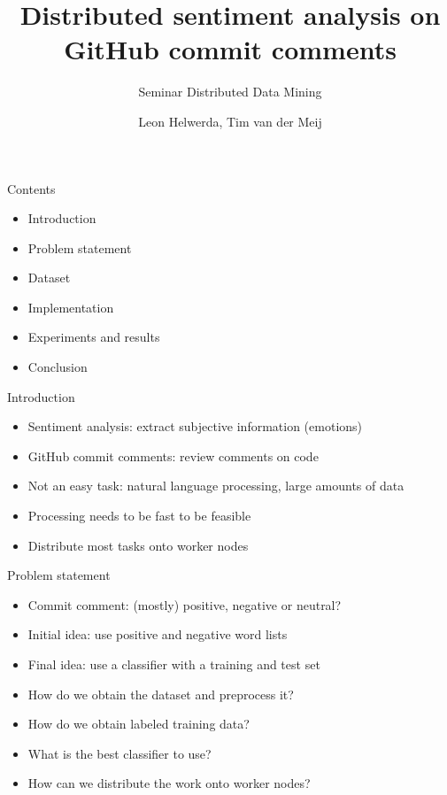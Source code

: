 \documentclass[t,11pt]{beamer}
\title{Distributed sentiment analysis on GitHub commit comments}
\subtitle{Seminar Distributed Data Mining}
\date{\now}
\author{Leon Helwerda, Tim van der Meij}
\begin{document}
{
\begin{frame}[plain]
  \maketitle
\end{frame}
\addtocounter{framenumber}{-1}}

\toggleslidecolors

\begin{frame}[fragile]{Contents}
\begin{itemize}
  \item Introduction
  \item Problem statement
  \item Dataset
  \item Implementation
  \item Experiments and results
  \item Conclusion
\end{itemize}
\end{frame}

\begin{frame}[fragile]{Introduction}
\begin{itemize}
  \item Sentiment analysis: extract subjective information (emotions)
  \item GitHub commit comments: review comments on code
  \item Not an easy task: natural language processing, large amounts of data
  \item Processing needs to be fast to be feasible
  \item Distribute most tasks onto worker nodes
\end{itemize}
\end{frame}

\begin{frame}[fragile]{Problem statement}
\begin{itemize}
  \item Commit comment: (mostly) positive, negative or neutral?
  \item Initial idea: use positive and negative word lists
  \item Final idea: use a classifier with a training and test set
\end{itemize}
\begin{itemize}
  \item How do we obtain the dataset and preprocess it?
  \item How do we obtain labeled training data?
  \item What is the best classifier to use?
  \item How can we distribute the work onto worker nodes?
\end{itemize}
\end{frame}
\end{document}
